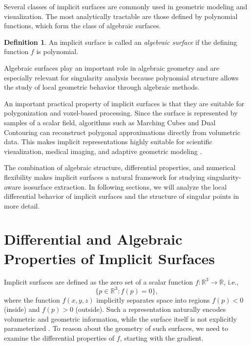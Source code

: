 \documentclass[12pt, a4paper, oneside]{book}
\theoremstyle{plain}
\theoremstyle{definition}
\newtheorem{definition}[theorem]{Definition}
\theoremstyle{remark}
\theoremstyle{definition}
\begin{document}
Several classes of implicit surfaces are commonly used in geometric modeling and visualization. The most analytically tractable are those defined by polynomial functions, which form the class of algebraic surfaces.

\begin{definition}
An implicit surface is called an \emph{algebraic surface} if the defining function $f$ is polynomial.
\end{definition}

Algebraic surfaces play an important role in algebraic geometry and are especially relevant for singularity analysis because polynomial structure allows the study of local geometric behavior through algebraic methods.


An important practical property of implicit surfaces is that they are suitable for polygonization and voxel-based processing. Since the surface is represented by samples of a scalar field, algorithms such as Marching Cubes and Dual Contouring can reconstruct polygonal approximations directly from volumetric data. This makes implicit representations highly suitable for scientific visualization, medical imaging, and adaptive geometric modeling \cite{bloomenthal2000implicit}.

The combination of algebraic structure, differential properties, and numerical flexibility makes implicit surfaces a natural framework for studying singularity-aware isosurface extraction. In following sections, we will analyze the local differential behavior of implicit surfaces and the structure of singular points in more detail.

\section{Differential and Algebraic Properties of Implicit Surfaces}

Implicit surfaces are defined as the zero set of a scalar function
$f:\mathbb{R}^3 \rightarrow \mathbb{R}$, i.e.,
\[
\{ p \in \mathbb{R}^3 : f(p) = 0 \},
\]
where the function $f(x,y,z)$ implicitly separates space into regions $f(p) < 0$ (inside) and $f(p) > 0$ (outside). Such a representation naturally encodes volumetric and geometric information, while the surface itself is not explicitly parameterized \cite{bloomenthal2000implicit}. To reason about the geometry of such surfaces, we need to examine the differential properties of $f$, starting with the gradient.
\end{document}
